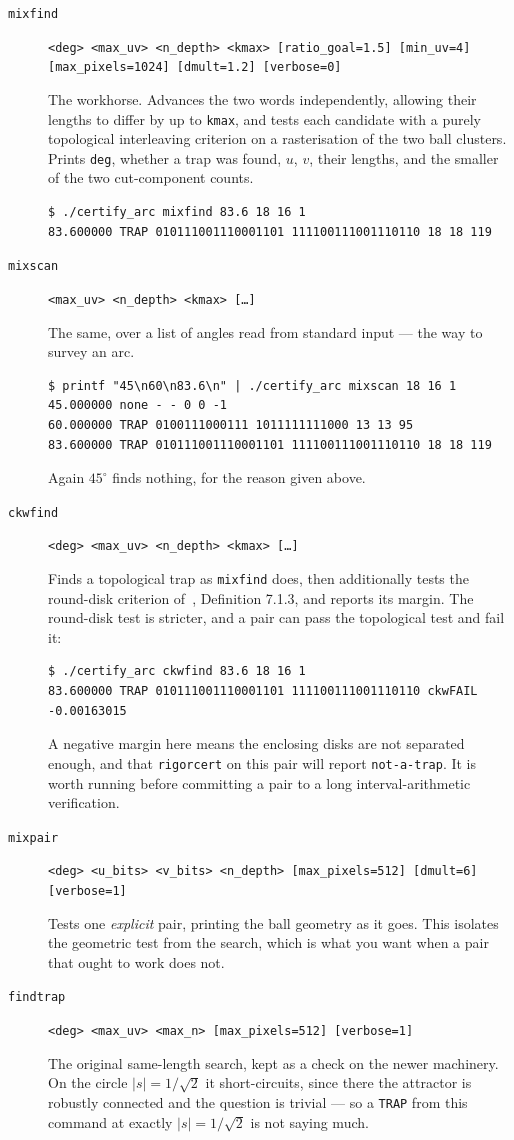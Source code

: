\documentclass{amsart}
\begin{document}
\begin{description}
\item[\texttt{mixfind}] \texttt{<deg> <max\_uv> <n\_depth> <kmax> [ratio\_goal=1.5] [min\_uv=4] [max\_pixels=1024] [dmult=1.2] [verbose=0]}


The workhorse.  Advances the two words independently, allowing their lengths to differ by up to
\texttt{kmax}, and tests each candidate with a purely topological interleaving criterion on a
rasterisation of the two ball clusters.  Prints \texttt{deg}, whether a trap was found, $u$, $v$,
their lengths, and the smaller of the two cut-component counts.
\begin{verbatim}
$ ./certify_arc mixfind 83.6 18 16 1
83.600000 TRAP 010111001110001101 111100111001110110 18 18 119
\end{verbatim}
\item[\texttt{mixscan}] \texttt{<max\_uv> <n\_depth> <kmax> [\ldots]}


The same, over a list of angles read from standard input --- the way to survey an arc.
\begin{verbatim}
$ printf "45\n60\n83.6\n" | ./certify_arc mixscan 18 16 1
45.000000 none - - 0 0 -1
60.000000 TRAP 0100111000111 1011111111000 13 13 95
83.600000 TRAP 010111001110001101 111100111001110110 18 18 119
\end{verbatim}
Again $45^\circ$ finds nothing, for the reason given above.
\item[\texttt{ckwfind}] \texttt{<deg> <max\_uv> <n\_depth> <kmax> [\ldots]}


Finds a topological trap as \texttt{mixfind} does, then additionally tests the round-disk
criterion of~\cite{paper}, Definition 7.1.3, and reports its margin.  The round-disk test is
stricter, and a pair can pass the topological test and fail it:
\begin{verbatim}
$ ./certify_arc ckwfind 83.6 18 16 1
83.600000 TRAP 010111001110001101 111100111001110110 ckwFAIL -0.00163015
\end{verbatim}
A negative margin here means the enclosing disks are not separated enough, and that
\texttt{rigorcert} on this pair will report \texttt{not-a-trap}.  It is worth running before
committing a pair to a long interval-arithmetic verification.
\item[\texttt{mixpair}] \texttt{<deg> <u\_bits> <v\_bits> <n\_depth> [max\_pixels=512] [dmult=6] [verbose=1]}


Tests one \emph{explicit} pair, printing the ball geometry as it goes.  This isolates the
geometric test from the search, which is what you want when a pair that ought to work does not.
\item[\texttt{findtrap}] \texttt{<deg> <max\_uv> <max\_n> [max\_pixels=512] [verbose=1]}


The original same-length search, kept as a check on the newer machinery.  On the circle
$|s| = 1/\sqrt2$ it short-circuits, since there the attractor is robustly connected and the
question is trivial --- so a \texttt{TRAP} from this command at exactly $|s| = 1/\sqrt2$ is not
saying much.
\end{description}
\end{document}

